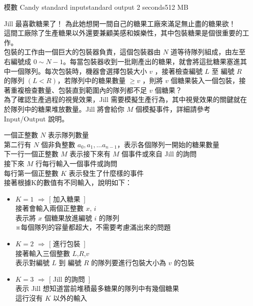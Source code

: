 \gdef\thisproblemauthor{}
\gdef\thisproblemdeveloper{}
\gdef\thisproblemorigin{}
\begin{problem}{模數 Candy} %
{standard input}{standard output}
{2 seconds}{512 MB}{}

Jill 最喜歡糖果了！\newline
為此她想開一間自己的糖果工廠來滿足無止盡的糖果欲！\\
\newline
這間工廠除了生產糖果以外還要兼顧美感和娛樂性，其中包裝糖果是個很重要的工作。\\
包裝的工作由一個巨大的包裝器負責，這個包裝器由 $N$ 道等待隊列組成，由左至右編號成 $0 \sim N-1$。每當包裝器收到一批剛產出的糖果，就會將這批糖果塞進其中一個隊列。每次包裝時，機器會選擇包裝大小 $v$ ，接著檢查編號 $L$ 至 編號 $R$ 的隊列 $(L<R)$，若隊列中的糖果數量 $ \geq v $ ，則將 $v$ 個糖果裝入一個包裝，接著重複檢查數量、包裝直到範圍內的隊列都不足 $v$ 個糖果？\\
\newline
為了確認生產過程的視覺效果，Jill 需要模擬生產行為，其中視覺效果的關鍵就在於隊列中的糖果堆放數量。Jill 將會給你 $M$ 個模擬事件，詳細請參考 Input/Output 說明。\\
\newline
\InputFile

一個正整數 $N$ 表示隊列數量 \\
第二行有 $N$ 個非負整數 $a_0,a_1,...a_{n-1}$，表示各個隊列一開始的糖果數量\\
下一行一個正整數 $M$ 表示接下來有 $M$ 個事件或來自 Jill 的詢問 \\
接下來 $M$ 行每行輸入一個事件或詢問 \\
每行第一個正整數 $K$ 表示發生了什麼樣的事件 \\
接著根據K的數值有不同輸入，說明如下：
\begin{itemize}
\item $K=1$ $\Rightarrow$ [ 加入糖果\ ] \\
接著會輸入兩個正整數 $x$, $i$ \\
表示將 $x$ 個糖果放進編號 $i$ 的隊列\\
※每個隊列的容量都超大，不需要考慮滿出來的問題
\item $K=2$ $\Rightarrow$ [ 進行包裝\ ] \\
接著輸入三個整數 $L$,$R$,$v$ \\
 表示對編號 $L$ 到 編號 $R$ 的隊列要進行包裝大小為 $v$ 的包裝
\item $K=3$ $\Rightarrow$ [ Jill 的詢問\ ] \\
表示 Jill 想知道當前堆積最多糖果的隊列中有幾個糖果\\
這行沒有 $K$ 以外的輸入
\end{itemize}


\end{problem}
